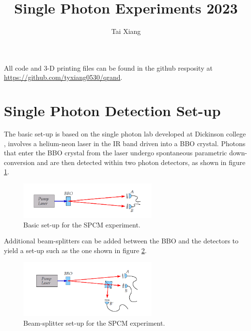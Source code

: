 \documentclass[letterpaper, 11 pt]{article}
\begin{document}
\title{Single Photon Experiments 2023}
\author{Tai Xiang}
\maketitle
\pagestyle{empty}

\tableofcontents
\newpage

All code and 3-D printing files can be found in the github resposity at \href{https://github.com/tyxiang0530/qrand}{https://github.com/tyxiang0530/qrand}.
\section{Single Photon Detection Set-up}

The basic set-up is based on the single photon lab developed at Dickinson college \cite{photon_setup}, involves a helium-neon laser in the IR band driven into a BBO crystal. Photons that enter the BBO crystal from the laser
undergo spontaneous parametric down-conversion and are then detected within two photon detectors, as shown in figure \ref{fig:spcm_setup_basic}.
\begin{figure}[H]
    \centering
    \includegraphics[width = 7cm]{setup_basic.png}
    \caption{Basic set-up for the SPCM experiment.}
    \label{fig:spcm_setup_basic}
\end{figure}

Additional beam-splitters can be added between the BBO and the detectors to
yield a set-up such as the one shown in figure \ref{fig:spcm_setup_bs}.
\begin{figure}[H]
    \centering
    \includegraphics[width = 7cm]{setup.png}
    \caption{Beam-splitter set-up for the SPCM experiment.}
    \label{fig:spcm_setup_bs}
\end{figure}
\end{document}
